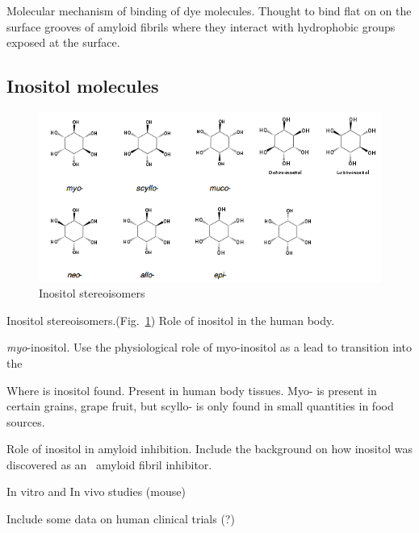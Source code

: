 \begin{outline}[enumerate]
	    \3 Molecular mechanism of binding of dye molecules. Thought to bind flat on on the surface grooves of amyloid fibrils where they interact with hydrophobic groups exposed at the surface. 
      
	\subsection{Inositol molecules}
	
	\begin{figure}
    \centering
    \includegraphics[width=6in]{figures/introduction/inositol.png}
    \caption[Inositol]{Inositol stereoisomers}
    \label{fig:inositols}
  \end{figure}
  
		\2 Inositol stereoisomers.(Fig.~\ref{fig:inositols}) Role of inositol in the human body.

			\3 \emph{myo}-inositol.  Use the physiological role of myo-inositol as a lead to transition into the 

		\2 Where is inositol found. Present in human body tissues. Myo- is present in certain grains, grape fruit, but scyllo- is only found in small quantities in food sources.
	
		\2 Role of inositol in amyloid inhibition. Include the background on how inositol was discovered as an \abeta\ amyloid fibril inhibitor.
		
			\3 In vitro and In vivo studies (mouse)
			
			\3 Include some data on human clinical trials (?)
			
\end{outline}

